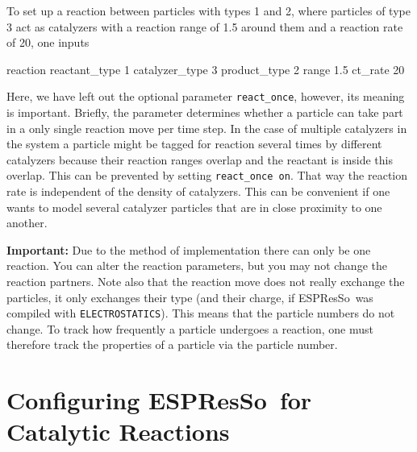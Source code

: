 \documentclass[aip,jcp,reprint,a4paper,onecolumn,nofootinbib,amsmath,amssymb]{revtex4-1}
\newcommand\code{\lstinline}
\newcommand{\es}{\mbox{\textsf{ESPResSo}}\xspace}
\newcommand\codees{\lstinline[language=espresso]}
\begin{document}
To set up a reaction between particles with types 1 and 2, where particles of type 3 act as catalyzers with a reaction range of 1.5 around them and a reaction rate of 20, one inputs
\begin{espresso}
reaction reactant_type 1 catalyzer_type 3 product_type 2 range 1.5 ct_rate 20
\end{espresso}
Here, we have left out the optional parameter \codees{react_once}, however, its meaning is important. Briefly, the parameter determines whether a particle can take part in a only single reaction move per time step. In the case of multiple catalyzers in the system a particle might be tagged for reaction several times by different catalyzers because their reaction ranges overlap and the reactant is inside this overlap. This can be prevented by setting \code{react_once on}. That way the reaction rate is independent of the density of catalyzers. This can be convenient if one wants to model several catalyzer particles that are in close proximity to one another.

\noindent\textbf{Important:} Due to the method of implementation there can only be one reaction. You can alter the reaction parameters, but you may not change the reaction partners. Note also that the reaction move does not really exchange the particles, it only exchanges their type (and their charge, if \es\ was compiled with \code{ELECTROSTATICS}). This means that the particle numbers do not change. To track how frequently a particle undergoes a reaction, one must therefore track the properties of a particle via the particle number.

\section{Configuring \es\ for Catalytic Reactions}
\end{document}

